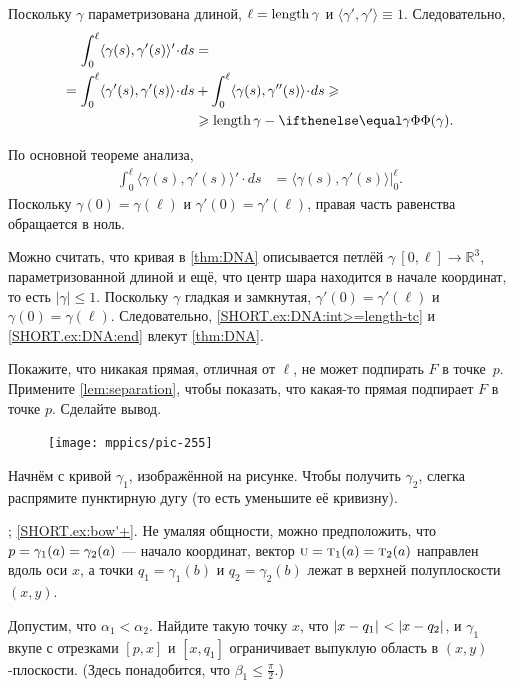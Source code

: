 \begin{multicols}{2}
Поскольку $\gamma$ параметризована длиной, $\ell\z=\length\gamma$ и $\langle\gamma',\gamma'\rangle\equiv1$.
Следовательно,
\begin{align*}
\int_0^\ell\langle\gamma(s),\gamma'(s)\rangle'\cdot ds&=\\
=\int_0^\ell\langle\gamma'(s),\gamma'(s)\rangle\cdot ds&+\int_0^\ell\langle\gamma(s),\gamma''(s)\rangle\cdot ds\ge
\\
&\ge \length\gamma-\tc\gamma.
\end{align*}

По основной теореме анализа,
\begin{align*}
\int_0^\ell\langle\gamma(s),\gamma'(s)\rangle'\cdot ds
&=\langle\gamma(s),\gamma'(s)\rangle\bigg|_0^\ell.
\end{align*}
Поскольку $\gamma(0)=\gamma(\ell)$ и $\gamma'(0)=\gamma'(\ell)$, правая часть равенства обращается в ноль.

Можно считать, что кривая в \ref{thm:DNA} описывается петлёй $\gamma\:[0,\ell]\to\mathbb{R}^3$, параметризованной длиной и ещё, что центр шара находится в начале координат, то есть $|\gamma|\le 1$.
Поскольку $\gamma$ гладкая и замкнутая, 
$\gamma'(0)=\gamma'(\ell)$ и $\gamma(0)=\gamma(\ell)$.
Следовательно, \ref{SHORT.ex:DNA:int>=length-tc} и \ref{SHORT.ex:DNA:end} влекут \ref{thm:DNA}.

Покажите, что никакая прямая, отличная от $\ell$, не может подпирать $F$ в точке~$p$. 
Примените \ref{lem:separation}, чтобы показать, что какая-то прямая подпирает $F$ в точке $p$.
Сделайте вывод.

{

\begin{figure}
\vskip-6mm
\centering
\texttt{[image: mppics/pic-255]}
\vskip0mm
\end{figure}

Начнём с кривой $\gamma_1$, изображённой на рисунке.
Чтобы получить $\gamma_2$, слегка распрямите пунктирную дугу (то есть уменьшите её кривизну).

}

\parbf{\ref{ex:bow'}}; \ref{SHORT.ex:bow'+}.
Не умаляя общности, можно предположить, что $p=\gamma_1(a)\z=\gamma_2(a)$ --- начало координат, 
вектор $\vec u=\tan_1(a)\z=\tan_2(a)$ направлен вдоль оси $x$,
а точки $q_1=\gamma_1(b)$ и $q_2=\gamma_2(b)$ лежат в верхней полуплоскости $(x,y)$.

Допустим, что $\alpha_1<\alpha_2$.
Найдите такую точку $x$, что
$\dist{x}{q_1}{}<\dist{x}{q_2}{}$, и
$\gamma_1$ вкупе с отрезками $[p,x]$ и $[x,q_1]$ ограничивает выпуклую область в $(x,y)$-плоскости.
(Здесь понадобится, что $\beta_1\le\tfrac\pi2$.)


\end{multicols}
